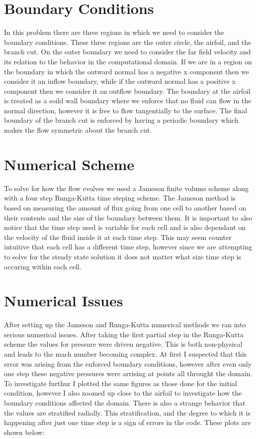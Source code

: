 \documentclass[a4paper,12pt,titlepage]{article}
\begin{document}
\section{Boundary Conditions}
In this problem there are three regions in which we need to consider the boundary conditions.  These three regions are the outer circle, the airfoil, and the branch cut.  On the outer boundary we need to consider the far field velocity and its relation to the behavior in the computational domain.  If we are in a region on the boundary in which the outward normal has a negative x component then we consider it an inflow boundary, while if the outward normal has a positive x component then we consider it an outflow boundary.  The boundary at the airfoil is treated as a soild wall boundary where we enforce that no fluid can flow in the normal direction, however it is free to flow tangentially to the surface.  The final boundary of the branch cut is enforced by having a periodic boundary which makes the flow symmetric about the branch cut.  

\section{Numerical Scheme}
To solve for how the flow evolves we used a Jameson finite volume scheme along with a four step Runga-Kutta time steping scheme.  The Jameson method is based on measuring the amount of flux going from one cell to another based on their contents and the size of the boundary between them.  It is important to also notice that the time step used is variable for each cell and is also dependant on the velocity of the fluid inside it at each time step.  This may seem counter intuitive that each cell has a different time step, however since we are attempting to solve for the steady state solution it does not matter what size time step is occuring within each cell.  

\section{Numerical Issues}
After setting up the Jameson and Runga-Kutta numerical methods we ran into serious numerical issues.  After taking the first partial step in the Runga-Kutta scheme the values for pressure were driven negative.  This is both non-physical and leads to the mach number becoming complex.  At first I suspected that this error was arising from the enforced boundary conditions, however after even only one step these negative pressures were arrising at points all throught the domain.  To investigate furthur I plotted the same figures as those done for the initial condition, however I also zoomed up close to the airfoil to investigate how the boundary conditions affected the domain.  There is also a strange behavior that the values are stratified radially.  This stratification, and the degree to which it is happening after just one time step is a sign of errors in the code.  These plots are shown below:
\end{document}

